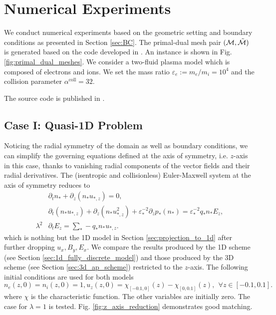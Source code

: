 \documentclass{article}
\begin{document}
\section{Numerical Experiments} \label{sec:numerical_experiment}

We conduct numerical experiments based on the geometric setting and boundary conditions as presented in Section \ref{sec:BC}. The primal-dual mesh pair $(\mathcal{M}, \Tilde{\mathcal{M}})$ is generated based on the code developed in \cite[][Ch. 1]{fuchs_2021}. An instance is shown in Fig. \ref{fig:primal_dual_meshes}. We consider a two-fluid plasma model which is composed of electrons and ions. We set the mass ratio $\varepsilon_e := m_e / m_i = 10^4$ and the collision parameter $\alpha^\text{coll} = 32$.

The source code is published in \cite{yu2022}.

\subsection{Case I: Quasi-1D Problem}
Noticing the radial symmetry of the domain as well as boundary conditions, we can simplify the governing equations defined at the axis of symmetry, i.e. $z$-axis in this case, thanks to vanishing radial components of the vector fields and their radial derivatives. The (isentropic and collisionless) Euler-Maxwell system at the axis of symmetry reduces to
\begin{align*}
    &\partial_t n_* + \partial_z(n_*u_{*,z}) = 0, \\
    &\partial_t (n_* u_{*,z}) + \partial_z(n_*u_{*,z}^2) + \varepsilon_*^{-2} \partial_z p_*(n_*) = \varepsilon_*^{-2}q_*n_*E_z, \\
    \lambda^2 &\partial_t E_z = \sum_* - q_* n_* u_{*,z}.
\end{align*}
which is nothing but the 1D model in Section \ref{sec:projection_to_1d} after further dropping $u_x, B_y, E_x$. We compare the results produced by the 1D scheme (see Section \ref{sec:1d_fully_discrete_model}) and those produced by the 3D scheme (see Section \ref{sec:3d_ap_scheme}) restricted to the $z$-axis. The following initial conditions are used for both models
\begin{equation*}
    n_e(z,0) = n_i(z,0) = 1, u_z(z,0) = \chi_{[-0.1,0]}(z) - \chi_{[0,0.1]}(z),\ \ \forall z \in [-0.1,0.1].
\end{equation*}
where $\chi$ is the characteristic function. The other variables are initially zero. The case for $\lambda = 1$ is tested. Fig. \ref{fig:z_axis_reduction} demonstrates good matching.
\end{document}

